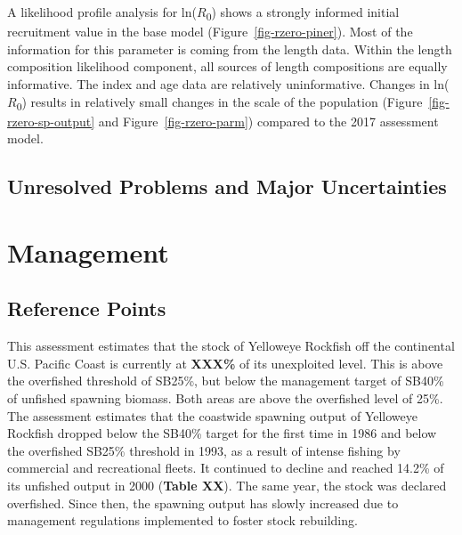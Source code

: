 \documentclass[
]{scrartcl}
\begin{document}
A likelihood profile analysis for ln(\(R\)\textsubscript{0}) shows a
strongly informed initial recruitment value in the base model
(Figure~\ref{fig-rzero-piner}). Most of the information for this
parameter is coming from the length data. Within the length composition
likelihood component, all sources of length compositions are equally
informative. The index and age data are relatively uninformative.
Changes in ln(\(R\)\textsubscript{0}) results in relatively small
changes in the scale of the population (Figure~\ref{fig-rzero-sp-output}
and Figure~\ref{fig-rzero-parm}) compared to the 2017 assessment model.

\subsection{Unresolved Problems and Major
Uncertainties}\label{unresolved-problems-and-major-uncertainties}

\newpage{}

\section{Management}\label{management}

\subsection{Reference Points}\label{reference-points-1}

This assessment estimates that the stock of Yelloweye Rockfish off the
continental U.S. Pacific Coast is currently at \textbf{XXX\%} of its
unexploited level. This is above the overfished threshold of SB25\%, but
below the management target of SB40\% of unfished spawning biomass. Both
areas are above the overfished level of 25\%. The assessment estimates
that the coastwide spawning output of Yelloweye Rockfish dropped below
the SB40\% target for the first time in 1986 and below the overfished
SB25\% threshold in 1993, as a result of intense fishing by commercial
and recreational fleets. It continued to decline and reached 14.2\% of
its unfished output in 2000 (\textbf{Table XX}). The same year, the
stock was declared overfished. Since then, the spawning output has
slowly increased due to management regulations implemented to foster
stock rebuilding.
\end{document}
